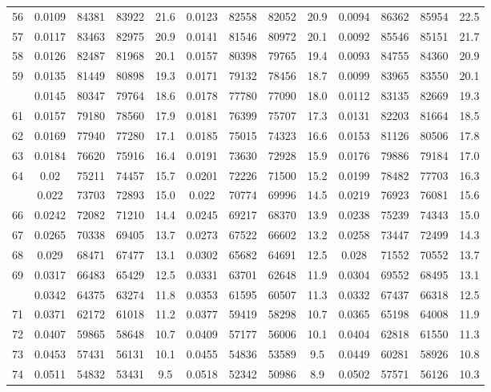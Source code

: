 \documentclass[
  14pt,
]{article}
\begin{document}
\begin{longtable}[t]{lcccccccccccc}
56 & 0.0109 & 84381 & 83922 & 21.6 & 0.0123 & 82558 & 82052 & 20.9 & 0.0094 & 86362 & 85954 & 22.5\\
57 & 0.0117 & 83463 & 82975 & 20.9 & 0.0141 & 81546 & 80972 & 20.1 & 0.0092 & 85546 & 85151 & 21.7\\
58 & 0.0126 & 82487 & 81968 & 20.1 & 0.0157 & 80398 & 79765 & 19.4 & 0.0093 & 84755 & 84360 & 20.9\\
59 & 0.0135 & 81449 & 80898 & 19.3 & 0.0171 & 79132 & 78456 & 18.7 & 0.0099 & 83965 & 83550 & 20.1\\
\addlinespace
60 & 0.0145 & 80347 & 79764 & 18.6 & 0.0178 & 77780 & 77090 & 18.0 & 0.0112 & 83135 & 82669 & 19.3\\
61 & 0.0157 & 79180 & 78560 & 17.9 & 0.0181 & 76399 & 75707 & 17.3 & 0.0131 & 82203 & 81664 & 18.5\\
62 & 0.0169 & 77940 & 77280 & 17.1 & 0.0185 & 75015 & 74323 & 16.6 & 0.0153 & 81126 & 80506 & 17.8\\
63 & 0.0184 & 76620 & 75916 & 16.4 & 0.0191 & 73630 & 72928 & 15.9 & 0.0176 & 79886 & 79184 & 17.0\\
64 & 0.02 & 75211 & 74457 & 15.7 & 0.0201 & 72226 & 71500 & 15.2 & 0.0199 & 78482 & 77703 & 16.3\\
\addlinespace
65 & 0.022 & 73703 & 72893 & 15.0 & 0.022 & 70774 & 69996 & 14.5 & 0.0219 & 76923 & 76081 & 15.6\\
66 & 0.0242 & 72082 & 71210 & 14.4 & 0.0245 & 69217 & 68370 & 13.9 & 0.0238 & 75239 & 74343 & 15.0\\
67 & 0.0265 & 70338 & 69405 & 13.7 & 0.0273 & 67522 & 66602 & 13.2 & 0.0258 & 73447 & 72499 & 14.3\\
68 & 0.029 & 68471 & 67477 & 13.1 & 0.0302 & 65682 & 64691 & 12.5 & 0.028 & 71552 & 70552 & 13.7\\
69 & 0.0317 & 66483 & 65429 & 12.5 & 0.0331 & 63701 & 62648 & 11.9 & 0.0304 & 69552 & 68495 & 13.1\\
\addlinespace
70 & 0.0342 & 64375 & 63274 & 11.8 & 0.0353 & 61595 & 60507 & 11.3 & 0.0332 & 67437 & 66318 & 12.5\\
71 & 0.0371 & 62172 & 61018 & 11.2 & 0.0377 & 59419 & 58298 & 10.7 & 0.0365 & 65198 & 64008 & 11.9\\
72 & 0.0407 & 59865 & 58648 & 10.7 & 0.0409 & 57177 & 56006 & 10.1 & 0.0404 & 62818 & 61550 & 11.3\\
73 & 0.0453 & 57431 & 56131 & 10.1 & 0.0455 & 54836 & 53589 & 9.5 & 0.0449 & 60281 & 58926 & 10.8\\
74 & 0.0511 & 54832 & 53431 & 9.5 & 0.0518 & 52342 & 50986 & 8.9 & 0.0502 & 57571 & 56126 & 10.3\\

\end{longtable}
\end{document}
